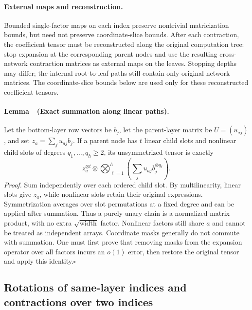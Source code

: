 \documentclass[a4paper]{tufte-handout}
\begin{document}
\begin{fullwidth}
\paragraph{External maps and reconstruction.}
Bounded single-factor maps on each index preserve nontrivial matricization bounds, but need not preserve coordinate-slice bounds.
After each contraction, the coefficient tensor must be reconstructed along the original computation tree: stop expansion at the corresponding parent nodes and use the resulting cross-network contraction matrices as external maps on the leaves.
Stopping depths may differ; the internal root-to-leaf paths still contain only original network matrices. The coordinate-slice bounds below are used only for these reconstructed coefficient tensors.

\paragraph{Lemma~\thelemma\ (Exact summation along linear paths).}
\label{fp:core-linear}
Let the bottom-layer row vectors be $b_j$, let the parent-layer matrix be $U=(u_{aj})$, and set
$z_a=\sum_ju_{aj}b_j$. If a parent node has $t$ linear child slots and nonlinear child slots of degrees
$q_1,\ldots,q_h\geq2$, its unsymmetrized tensor is exactly
\begin{equation}
 z_a^{\otimes t}\otimes
 \bigotimes_{\ell=1}^h\left(\sum_j u_{aj}b_j^{\otimes q_\ell}\right).
 \label{fp:core-linear-identity}
\end{equation}
\emph{Proof.} Sum independently over each ordered child slot. By multilinearity, linear slots give $z_a$, while nonlinear slots retain their original expressions.
Symmetrization averages over slot permutations at a fixed degree and can be applied after summation. Thus a purely unary chain is a normalized matrix product, with no extra
$\sqrt{\text{width}}$ factor. Nonlinear factors still share $a$ and cannot be treated as independent arrays.
Coordinate masks generally do not commute with summation. One must first prove that removing masks from the expansion operator over all factors incurs an
$o(1)$ error, then restore the original tensor and apply this identity.\hfill$\square$

\subsection{Rotations of same-layer indices and contractions over two indices}
\label{fp:core-fresh-section}


\end{fullwidth}
\end{document}
